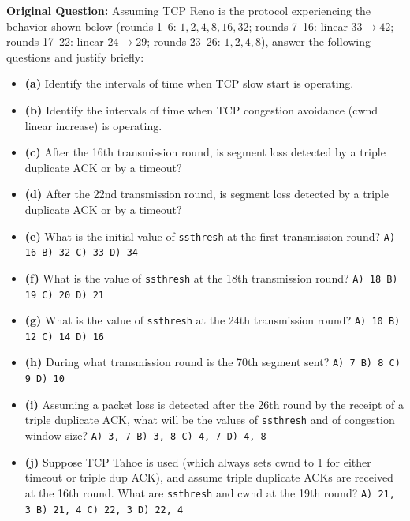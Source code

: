 \textbf{Original Question:} Assuming TCP Reno is the protocol experiencing the behavior shown below (rounds 1–6: $1,2,4,8,16,32$; rounds 7–16: linear $33\to 42$; rounds 17–22: linear $24\to 29$; rounds 23–26: $1,2,4,8$), answer the following questions and justify briefly:
\begin{itemize}
\item \textbf{(a)} Identify the intervals of time when TCP slow start is operating.
\item \textbf{(b)} Identify the intervals of time when TCP congestion avoidance ($\mathrm{cwnd}$ linear increase) is operating.
\item \textbf{(c)} After the 16th transmission round, is segment loss detected by a triple duplicate ACK or by a timeout?
\item \textbf{(d)} After the 22nd transmission round, is segment loss detected by a triple duplicate ACK or by a timeout?
\item \textbf{(e)} What is the initial value of \texttt{ssthresh} at the first transmission round? \quad \texttt{A) 16 \quad B) 32 \quad C) 33 \quad D) 34}
\item \textbf{(f)} What is the value of \texttt{ssthresh} at the 18th transmission round? \quad \texttt{A) 18 \quad B) 19 \quad C) 20 \quad D) 21}
\item \textbf{(g)} What is the value of \texttt{ssthresh} at the 24th transmission round? \quad \texttt{A) 10 \quad B) 12 \quad C) 14 \quad D) 16}
\item \textbf{(h)} During what transmission round is the 70th segment sent? \quad \texttt{A) 7 \quad B) 8 \quad C) 9 \quad D) 10}
\item \textbf{(i)} Assuming a packet loss is detected after the 26th round by the receipt of a triple duplicate ACK, what will be the values of \texttt{ssthresh} and of congestion window size? \quad \texttt{A) 3, 7 \quad B) 3, 8 \quad C) 4, 7 \quad D) 4, 8}
\item \textbf{(j)} Suppose TCP Tahoe is used (which always sets $\mathrm{cwnd}$ to 1 for either timeout or triple dup ACK), and assume triple duplicate ACKs are received at the 16th round. What are \texttt{ssthresh} and $\mathrm{cwnd}$ at the 19th round? \quad \texttt{A) 21, 3 \quad B) 21, 4 \quad C) 22, 3 \quad D) 22, 4}
\end{itemize}



